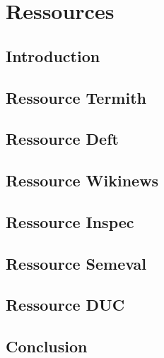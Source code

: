 \chapter{Ressources}
\label{chap:main-data_description}
  \section{Introduction}
  \label{sec:main-data_description-introduction}


  \section{Ressource Termith}
  \label{sec:main-data_description-termith_data}


  \section{Ressource Deft}
  \label{sec:main-data_description-deft_data}


  \section{Ressource Wikinews}
  \label{sec:main-data_description-wikinews_data}


  \section{Ressource Inspec}
  \label{sec:main-data_description-inspec_data}


  \section{Ressource Semeval}
  \label{sec:main-data_description-semeval_data}


  \section{Ressource DUC}
  \label{sec:main-data_description-duc_data}


  \section{Conclusion}
  \label{sec:main-data_description-conclusion}

